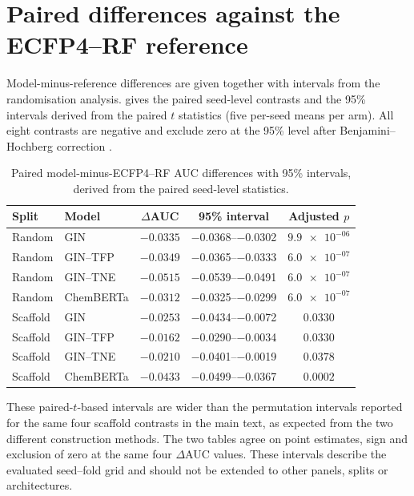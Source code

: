 \documentclass[11pt,a4paper]{article}
\begin{document}
\section{Paired differences against the ECFP4--RF reference}
\label{sec:paired_ci_si}

Model-minus-reference differences are given together with intervals from the randomisation analysis.  gives the paired seed-level contrasts and the 95\% intervals derived from the paired $t$ statistics (five per-seed means per arm). All eight contrasts are negative and exclude zero at the 95\% level after Benjamini--Hochberg correction \citep{benjamini1995}.

\begin{table}[h]
\centering
\caption{Paired model-minus-ECFP4--RF AUC differences with 95\% intervals, derived from the paired seed-level statistics.}
\label{tab:s4_paired_ci}
\begin{tabular}{llccc}
\toprule
Split & Model & $\Delta$AUC & 95\% interval & Adjusted $p$ \\
\midrule
Random & GIN & $-\num{0.0335}$ & \numrange{-0.0368}{-0.0302} & $\num{9.9e-06}$ \\
Random & GIN--TFP & $-\num{0.0349}$ & \numrange{-0.0365}{-0.0333} & $\num{6.0e-07}$ \\
Random & GIN--TNE & $-\num{0.0515}$ & \numrange{-0.0539}{-0.0491} & $\num{6.0e-07}$ \\
Random & ChemBERTa & $-\num{0.0312}$ & \numrange{-0.0325}{-0.0299} & $\num{6.0e-07}$ \\
Scaffold & GIN & $-\num{0.0253}$ & \numrange{-0.0434}{-0.0072} & $\num{0.0330}$ \\
Scaffold & GIN--TFP & $-\num{0.0162}$ & \numrange{-0.0290}{-0.0034} & $\num{0.0330}$ \\
Scaffold & GIN--TNE & $-\num{0.0210}$ & \numrange{-0.0401}{-0.0019} & $\num{0.0378}$ \\
Scaffold & ChemBERTa & $-\num{0.0433}$ & \numrange{-0.0499}{-0.0367} & $\num{0.0002}$ \\
\bottomrule
\end{tabular}
\end{table}

These paired-$t$-based intervals are wider than the permutation intervals reported for the same four scaffold contrasts in the main text, as expected from the two different construction methods. The two tables agree on point estimates, sign and exclusion of zero at the same four $\Delta$AUC values. These intervals describe the evaluated seed--fold grid and should not be extended to other panels, splits or architectures.
\end{document}
